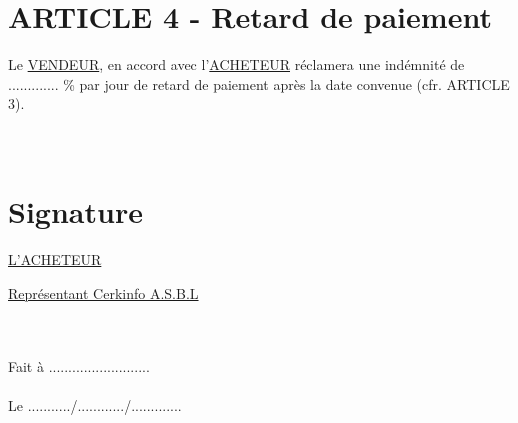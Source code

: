\documentclass{article}
\begin{document}
\section*{ARTICLE 4 - Retard de paiement}
Le \underline{VENDEUR}, en accord avec l'\underline{ACHETEUR} réclamera une indémnité de ............. \%  par jour de retard de paiement après la date convenue (cfr. ARTICLE 3).
\\\\\\
\begin{minipage}{0.4\textwidth}
\section*{Signature}
\end{minipage}
\begin{minipage}{0.4\textwidth}
\underline{L'ACHETEUR}
\end{minipage}
\begin{minipage}{0.4\textwidth}
\underline{Représentant Cerkinfo A.S.B.L}
\end{minipage}
\\\\
Fait à .......................... \\\\
Le .........../............/.............
\end{document}
